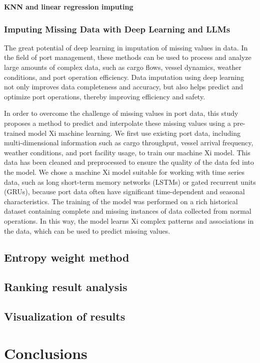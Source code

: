 \documentclass[preprint]{elsarticle}
\begin{document}
\textbf{KNN and linear regression imputing} \cite{10.1371/journal.pone.0295632} \cite{articleLearnKNN} \cite{inproceedingsKNearest} \cite{Emmanuel2021}
% 
% 
% 

\subsubsection{Imputing Missing Data with Deep Learning and LLMs}
% 
% 
% 

The great potential of deep learning in imputation of missing values in data. In the field of port management, these methods can be used to process and analyze large amounts of complex data, such as cargo flows, vessel dynamics, weather conditions, and port operation efficiency. Data imputation using deep learning not only improves data completeness and accuracy, but also helps predict and optimize port operations, thereby improving efficiency and safety. \cite{9458712} \cite{wang2022deep} \cite{park2022longterm} \cite{camino2019improving}
% 
% 
% 
% 
% 

In order to overcome the challenge of missing values in port data, this study proposes a method to predict and interpolate these missing values using a pre-trained model Xi machine learning. We first use existing port data, including multi-dimensional information such as cargo throughput, vessel arrival frequency, weather conditions, and port facility usage, to train our machine Xi model. This data has been cleaned and preprocessed to ensure the quality of the data fed into the model.
We chose a machine Xi model suitable for working with time series data, such as long short-term memory networks (LSTMs) or gated recurrent units (GRUs), because port data often have significant time-dependent and seasonal characteristics. The training of the model was performed on a rich historical dataset containing complete and missing instances of data collected from normal operations. In this way, the model learns Xi complex patterns and associations in the data, which can be used to predict missing values.
% 
% 
% 
% 
% 


\subsection{Entropy weight method}

\subsection{Ranking result analysis}
\subsection{Visualization of results}
\section{Conclusions}

\end{document}
